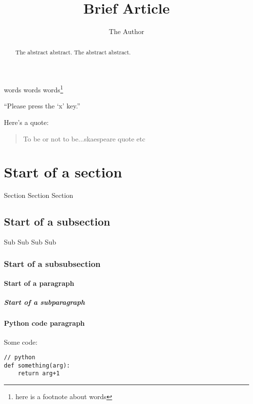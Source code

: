 \documentclass[11pt, oneside]{article}   	%
\title{Brief Article}
\author{The Author}
\begin{document}
\maketitle

\begin{abstract}
The abstract abstract. The abstract abstract.
\end{abstract}

words words words\footnote{here is a footnote about words}

``Please press the `x' key.''

Here's a quote:

\begin{quote}
To be or not to be...skaespeare quote etc
\end{quote}

\tableofcontents

\section{Start of a section}
Section Section Section
\subsection{Start of a subsection}
Sub Sub Sub Sub
\subsubsection{Start of a subsubsection}
\paragraph{Start of a paragraph}
\subparagraph{Start of a subparagraph}


\paragraph{Python code paragraph\newline}

Some code:

\begin{verbatim}
// python
def something(arg):
    return arg+1
\end{verbatim}
\end{document}
